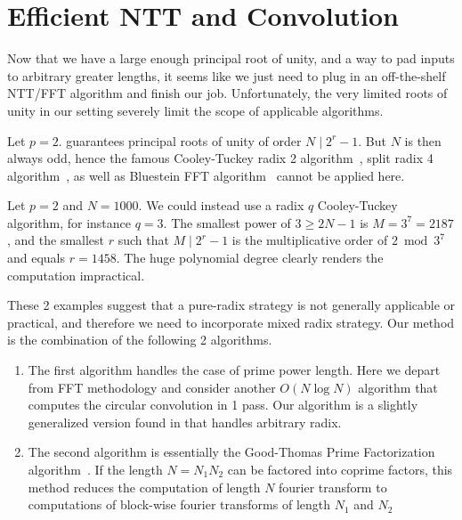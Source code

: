 \section{Efficient NTT and Convolution} \label{section:ntt}
Now that we have a large enough principal root of unity, and a way to pad inputs to arbitrary greater lengths, it seems like we just need to plug in an off-the-shelf NTT/FFT algorithm and finish our job. Unfortunately, the very limited roots of unity in our setting severely limit the scope of applicable algorithms.

\begin{example}
    Let \(p = 2\).  guarantees principal roots of unity of order \(N \mid 2^r - 1\). But \(N\) is then always odd, hence the famous Cooley-Tuckey radix 2 algorithm~\cite{IEEE:Cooley67}, split radix 4 algorithm~\cite{EL:Duhamel84}, as well as Bluestein FFT algorithm~\cite{IEEE:Bluestein70} cannot be applied here.
\end{example}
\begin{example}
    Let \(p =2\) and \(N = 1000\). We could instead use a radix \(q\) Cooley-Tuckey algorithm, for instance \(q = 3\). The smallest power of \(3 \ge 2N - 1\) is \(M = 3^7 = 2187\), and the smallest \(r\) such that \(M \mid 2^r - 1\) is the multiplicative order of \(2 \bmod 3^7\) and equals \(r = 1458\). The huge polynomial degree clearly renders the computation impractical.
\end{example}

These 2 examples suggest that a pure-radix strategy is not generally applicable or practical, and therefore we need to incorporate mixed radix strategy. Our method is the combination of the following 2 algorithms.
\begin{enumerate}
    \item The first algorithm handles the case of prime power length. Here we depart from FFT methodology and consider another \(O(N \log N)\) algorithm that computes the circular convolution in 1 pass. Our algorithm is a slightly generalized version found in \cite{ARXIV:Rosowski21} that handles arbitrary radix.
    \item The second algorithm is essentially the Good-Thomas Prime Factorization algorithm~\cite{JRSS:Good58,ADC:Thomas63}. If the length \(N = N_1 N_2\) can be factored into coprime factors, this method reduces the computation of length \(N\) fourier transform to computations of block-wise fourier transforms of length \(N_1\) and \(N_2\)
\end{enumerate}

